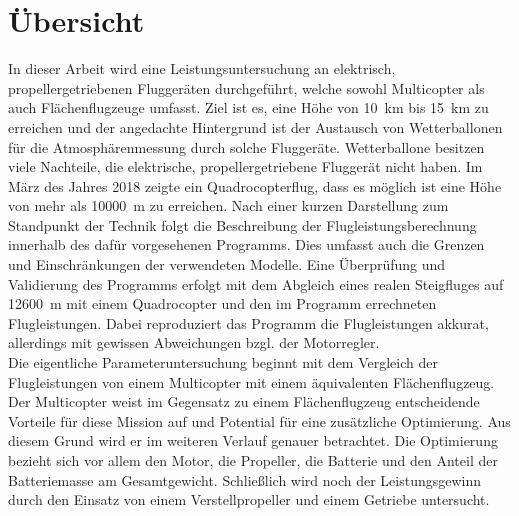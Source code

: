 \chapter*{Übersicht}
In dieser Arbeit wird eine Leistungsuntersuchung an elektrisch, propellergetriebenen Fluggeräten durchgeführt, welche sowohl Multicopter als auch Flächenflugzeuge umfasst. Ziel ist es, eine Höhe von \SI{10}{km} bis \SI{15}{km} zu erreichen und der angedachte Hintergrund ist der Austausch von Wetterballonen für die Atmosphärenmessung durch solche Fluggeräte. Wetterballone besitzen viele Nachteile, die elektrische, propellergetriebene Fluggerät nicht haben. Im März des Jahres 2018 zeigte ein Quadrocopterflug, dass es möglich ist eine Höhe von mehr als \SI{10000}{m} zu erreichen. 
Nach einer kurzen Darstellung zum Standpunkt der Technik folgt die Beschreibung der Flugleistungsberechnung innerhalb des dafür vorgesehenen Programms. Dies umfasst auch die Grenzen und Einschränkungen der verwendeten Modelle. Eine Überprüfung und Validierung des Programms erfolgt mit dem Abgleich eines realen Steigfluges auf \SI{12600}{m} mit einem Quadrocopter und den im Programm errechneten Flugleistungen. Dabei reproduziert das Programm die Flugleistungen akkurat, allerdings mit gewissen Abweichungen bzgl. der Motorregler. \\
Die eigentliche Parameteruntersuchung beginnt mit dem Vergleich der Flugleistungen von einem Multicopter mit einem äquivalenten Flächenflugzeug. Der Multicopter weist im Gegensatz zu einem Flächenflugzeug entscheidende Vorteile für diese Mission auf und Potential für eine zusätzliche Optimierung. Aus diesem Grund wird er im weiteren Verlauf genauer betrachtet. Die Optimierung bezieht sich vor allem den Motor, die Propeller, die Batterie und den Anteil der Batteriemasse am Gesamtgewicht. Schließlich wird noch der Leistungsgewinn durch den Einsatz von einem Verstellpropeller und einem Getriebe untersucht. 



